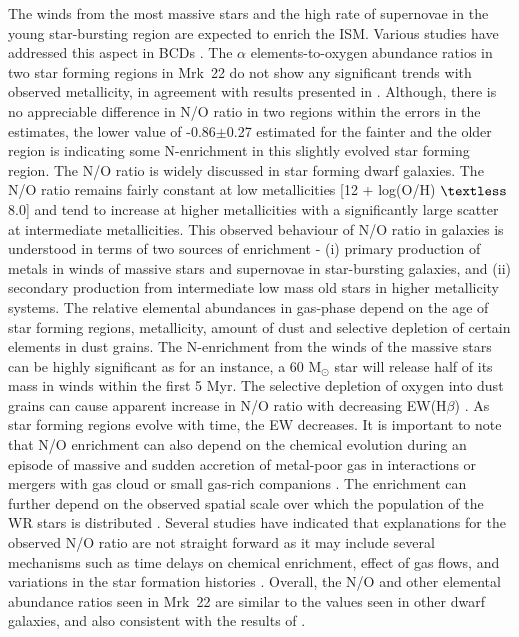 \documentclass[useAMS,usenatbib]{mn2e}
\begin{document}
The winds from the most massive stars and the high rate of supernovae in the young star-bursting region are expected to enrich the ISM. Various studies have addressed this aspect in BCDs \citep{1979A&A....80..252C,1979A&A....80..234C,1981A&A....99...97M,1983A&A...120..113M,1992A&A...264..105M,
1993fces.conf..173M,1986ARA&A..24..329C,2002ApJ...567..532H,2009A&A...508..615L,2010A&A...517A..85L,
2013ApJ...764...44Z}. The $\alpha $ elements-to-oxygen abundance ratios in two star forming regions in Mrk~22 do not show any significant trends with observed metallicity, in agreement with results presented in \citet{2006A&A...448..955I}. Although, there is no appreciable difference in N/O ratio in two regions within the errors in the estimates, the lower value of -0.86$\pm$0.27 estimated for the fainter and the older region is indicating some N-enrichment in this slightly evolved star forming region. The N/O ratio is widely discussed in star forming dwarf galaxies. The N/O ratio remains fairly constant at low metallicities [12 + log(O/H) $\textless$ 8.0] and tend to increase at higher metallicities \citep{2006A&A...448..955I,2012A&A...546A.122I,2014A&A...569A.110L,2014MNRAS.445.2061L} with a significantly large scatter at intermediate metallicities. This observed behaviour of N/O ratio in galaxies is understood in terms of two sources of enrichment - (i) primary production of metals in winds of massive stars and supernovae in star-bursting galaxies, and (ii) secondary production from intermediate low mass old stars in higher metallicity systems. The relative elemental abundances in gas-phase depend on the age of star forming regions, metallicity, amount of dust and selective depletion of certain elements in dust grains. The N-enrichment from the winds of the massive stars can be highly significant as for an instance, a 60 M$_{\odot}$ star will release half of its mass in winds within the first 5 Myr. The selective depletion of oxygen into dust grains can cause apparent increase in N/O ratio with decreasing EW(H$\beta$) \citep{2006A&A...448..955I,2008A&A...485..657B,2010A&A...517A..85L}. As star forming regions evolve with time, the EW decreases. It is important to note that N/O enrichment can also depend on the chemical evolution during an episode of massive and sudden accretion of metal-poor gas in interactions or mergers with gas cloud or small gas-rich companions \citep[e.g.,][]{2005A&A...434..531K,2008MNRAS.385.2181F}. The enrichment can further depend on the observed spatial scale over which the population of the WR stars is distributed \citep{2011A&A...532A.141P}. Several studies have indicated that explanations for the observed N/O ratio are not straight forward as it may include several  mechanisms such as time delays on chemical enrichment, effect of gas flows, and variations in the star formation histories \citep[e.g.,][]{1990PASP..102..230G,1992A&A...260...58P,1999MNRAS.306..317K,2006ApJ...636..214V,2006MNRAS.372.1069M,
2012MNRAS.421.1624P}. Overall, the N/O and other elemental abundance ratios seen in Mrk~22 are similar to the values seen in other dwarf galaxies, and also consistent with the results of \citet{2006A&A...448..955I}. 
\end{document}
